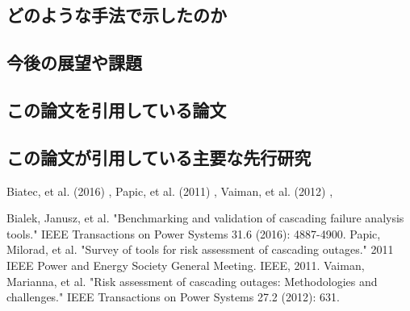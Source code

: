 \documentclass[a4paper,11pt]{jsarticle}
\begin{document}
    \subsection{どのような手法で示したのか}
    \subsection{今後の展望や課題}
    \subsection{この論文を引用している論文}
    \subsection{この論文が引用している主要な先行研究}
    Biatec, et al. (2016) \cite{BialekETAL2016},
    Papic, et al. (2011) \cite{PapicETAL2011},
    Vaiman, et al. (2012) \cite{VaimanETAL2012},

\newpage

\begin{thebibliography}{99}
  Bialek, Janusz, et al. "Benchmarking and validation of cascading failure analysis tools." IEEE Transactions on Power Systems 31.6 (2016): 4887-4900.
  Papic, Milorad, et al. "Survey of tools for risk assessment of cascading outages." 2011 IEEE Power and Energy Society General Meeting. IEEE, 2011.
  Vaiman, Marianna, et al. "Risk assessment of cascading outages: Methodologies and challenges." IEEE Transactions on Power Systems 27.2 (2012): 631.
\end{thebibliography}
\end{document}
